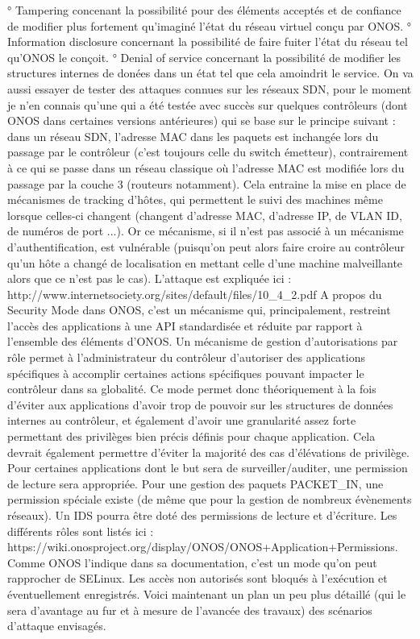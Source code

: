 ° Tampering concenant la possibilité pour des éléments acceptés et de confiance de modifier plus fortement qu’imaginé l’état du réseau virtuel conçu par ONOS.
° Information disclosure concernant la possibilité de faire fuiter l’état du réseau tel qu’ONOS le conçoit.
° Denial of service concernant la possibilité de modifier les structures internes de donées dans un état tel que cela amoindrit le service.
On va aussi essayer de tester des attaques connues sur les réseaux SDN, pour le moment je n’en connais qu’une qui a été testée avec succès sur quelques contrôleurs (dont ONOS dans certaines versions antérieures) qui se base sur le principe suivant :
dans un réseau SDN, l’adresse MAC dans les paquets est inchangée lors du passage par le contrôleur (c’est toujours celle du switch émetteur), contrairement à ce qui se passe dans un réseau classique où l’adresse MAC est modifiée lors du passage par la couche 3 (routeurs notamment).
Cela entraine la mise en place de mécanismes de tracking d’hôtes, qui permettent le suivi des machines même lorsque celles-ci changent (changent d’adresse MAC, d’adresse IP, de VLAN ID, de numéros de port ...).
Or ce mécanisme, si il n’est pas associé à un mécanisme d’authentification, est vulnérable (puisqu’on peut alors faire croire au contrôleur qu’un hôte a changé de localisation en mettant celle d’une machine malveillante alors que ce n’est pas le cas).
L’attaque est expliquée ici :
http://www.internetsociety.org/sites/default/files/10_4_2.pdf
A propos du Security Mode dans ONOS, c’est un mécanisme qui, principalement, restreint l’accès des applications à une API standardisée et réduite par rapport à l’ensemble des éléments d’ONOS. Un mécanisme de gestion d’autorisations par rôle permet à l’administrateur du contrôleur d’autoriser des applications spécifiques à accomplir certaines actions spécifiques pouvant impacter le contrôleur dans sa globalité. Ce mode permet donc théoriquement à la fois d’éviter aux applications d’avoir trop de pouvoir sur les structures de données internes au contrôleur, et également d’avoir une granularité assez forte permettant des privilèges bien précis définis pour chaque application. Cela devrait également permettre d’éviter la majorité des cas d’élévations de privilège.
Pour certaines applications dont le but sera de surveiller/auditer, une permission de lecture sera appropriée. Pour une gestion des paquets PACKET_IN, une permission spéciale existe (de même que pour la gestion de nombreux évènements réseaux). Un IDS pourra être doté des permissions de lecture et d’écriture. Les différents rôles sont listés ici : https://wiki.onosproject.org/display/ONOS/ONOS+Application+Permissions.
Comme ONOS l’indique dans sa documentation, c’est un mode qu’on peut rapprocher de SELinux. Les accès non autorisés sont bloqués à l’exécution et éventuellement enregistrés.
Voici maintenant un plan un peu plus détaillé (qui le sera d’avantage au fur et à mesure de l’avancée des travaux) des scénarios d’attaque envisagés.
